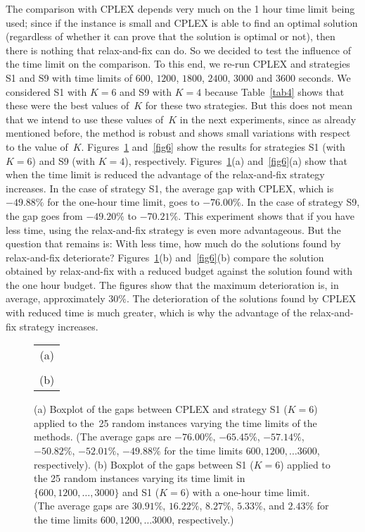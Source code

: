 \documentclass[11pt]{article}
\begin{document}
The comparison with CPLEX depends very much on the 1 hour time limit being used; since if the instance is small and CPLEX is able to find an optimal solution (regardless of whether it can prove that the solution is optimal or not), then there is nothing that relax-and-fix can do. So we decided to test the influence of the time limit on the comparison. To this end, we re-run CPLEX and strategies S1 and S9 with time limits of $600$, $1200$, $1800$, $2400$, $3000$ and $3600$ seconds. We considered S1 with $K=6$ and S9 with $K=4$ because Table~\ref{tab4} shows that these were the best values of~$K$ for these two strategies. But this does not mean that we intend to use these values of~$K$ in the next experiments, since as already mentioned before, the method is robust and shows small variations with respect to the value of~$K$. Figures~\ref{fig5} and~\ref{fig6} show the results for strategies S1 (with $K=6$) and S9 (with $K=4$), respectively. Figures~\ref{fig5}(a) and~\ref{fig6}(a) show that when the time limit is reduced the advantage of the relax-and-fix strategy increases. In the case of strategy S1, the average gap with CPLEX, which is $-49.88\%$ for the one-hour time limit, goes to $-76.00\%$.  In the case of strategy S9, the gap goes from $-49.20\%$ to $-70.21\%$. This experiment shows that if you have less time, using the relax-and-fix strategy is even more advantageous. But the question that remains is: With less time, how much do the solutions found by relax-and-fix deteriorate? Figures~\ref{fig5}(b) and~\ref{fig6}(b) compare the solution obtained by relax-and-fix with a reduced budget against the solution found with the one hour budget. The figures show that the maximum deterioration is, in average, approximately $30\%$. The deterioration of the solutions found by CPLEX with reduced time is much greater, which is why the advantage of the relax-and-fix strategy increases.

\begin{figure}[!ht]
\centering
\begin{tabular}[!ht]{c}
\\
(a)\\
\\
(b)
\end{tabular}
\caption{(a) Boxplot of the gaps between CPLEX and strategy S1 ($K=6$) applied to the~25 random instances varying the time limits of the methods. (The average gaps are $-76.00\%$, $-65.45\%$, $-57.14\%$, $-50.82\%$, $-52.01\%$, $-49.88\%$ for the time limits $600, 1200, \dots 3600$, respectively). (b) Boxplot of the gaps between S1 ($K=6$) applied to the 25 random instances varying its time limit in $\{600, 1200, \dots, 3000\}$ and S1 ($K=6$) with a one-hour time limit. (The average gaps are $30.91\%$, $16.22\%$, $8.27\%$, $5.33\%$, and $2.43\%$ for the time limits $600, 1200, \dots 3000$, respectively.)}
\label{fig5}
\end{figure}
\end{document}
